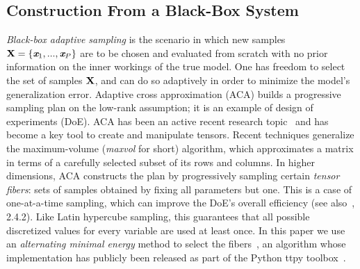 \documentclass[review, twocolumn]{svjour3}          %
\begin{document}
\subsection{Construction From a Black-Box System} \label{sec:adaptive_sampling}


\emph{Black-box adaptive sampling} is the scenario in which new samples $\mat{X} = \{\vec{x}_1, ..., \vec{x}_P\}$ are to be chosen and evaluated from scratch with no prior information on the inner workings of the true model. One has freedom to select the set of samples $\mathbf{X}$, and can do so adaptively in order to minimize the model's generalization error. 
Adaptive cross approximation (ACA) builds a progressive sampling plan on the low-rank assumption; it is an example of design of experiments (DoE). ACA has been an active recent research topic~\cite{OST:08, CC:10, OT:10, SO:11} and has become a key tool to create and manipulate tensors. Recent techniques generalize the maximum-volume (\emph{maxvol} for short) algorithm, which approximates a matrix in terms of a carefully selected subset of its rows and columns. In higher dimensions, ACA constructs the plan by progressively sampling certain \emph{tensor fibers}: sets of samples obtained by fixing all parameters but one. This is a case of one-at-a-time sampling, which can improve the DoE's overall efficiency (see also~\cite{SRACCGST:08}, 2.4.2). Like Latin hypercube sampling, this guarantees that all possible discretized values for every variable are used at least once. In this paper we use an \emph{alternating minimal energy} method to select the fibers~\cite{DS:14}, an algorithm whose implementation has publicly been released as part of the Python ttpy toolbox~\cite{ttpy}.
\end{document}
